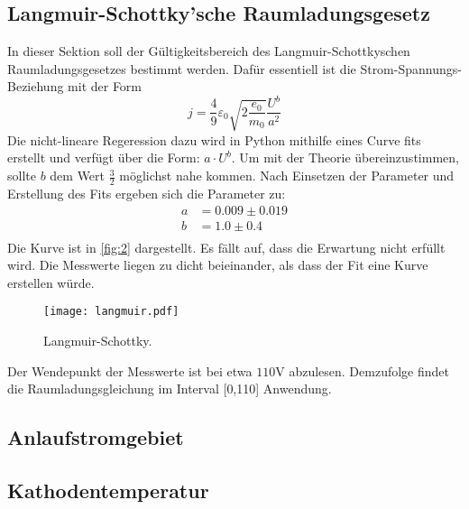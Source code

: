 \subsection{Langmuir-Schottky'sche Raumladungsgesetz}
In dieser Sektion soll der Gültigkeitsbereich des Langmuir-Schottkyschen 
Raumladungsgesetzes bestimmt werden. Dafür essentiell ist die Strom-Spannungs-
Beziehung mit der Form
\begin{equation}
    j = \frac{4}{9} \varepsilon_0 \sqrt{2 \frac{e_0}{m_0}} \frac{U^b}{a^2}
\end{equation}
Die nicht-lineare Regeression dazu wird in Python mithilfe eines Curve fits 
erstellt und verfügt über die Form: $a \cdot U^b$. Um mit der Theorie
übereinzustimmen, sollte $b$ dem Wert $\frac{3}{2}$ möglichst nahe kommen.
Nach Einsetzen der Parameter und Erstellung des Fits ergeben sich die Parameter 
zu:
\begin{align*}
    a &= 0.009 \pm 0.019 \\
    b &= 1.0 \pm 0.4 \\
\end{align*}
Die Kurve ist in \autoref{fig:2} dargestellt. Es fällt auf, dass die Erwartung 
nicht erfüllt wird. Die Messwerte liegen zu dicht beieinander, als dass der Fit 
eine Kurve erstellen würde.
\begin{figure}[H]
    \centering
    \texttt{[image: langmuir.pdf]}
    \caption{Langmuir-Schottky.}
    \label{fig:2}  %
\end{figure}
\noindent Der Wendepunkt der Messwerte ist bei etwa $110 \unit{\volt}$ abzulesen.
Demzufolge findet die Raumladungsgleichung im Interval [0,110] Anwendung.

\subsection{Anlaufstromgebiet}


\subsection{Kathodentemperatur}

